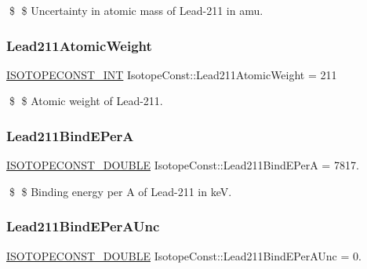 \$ \$ Uncertainty in atomic mass of Lead-\/211 in amu. \mbox{\label{group___isotope_const-_lead-_pb211_gae0bcf247364b4c5eb7ac9d0209ad4f38}} 
\subsubsection{\texorpdfstring{Lead211\+Atomic\+Weight}{Lead211AtomicWeight}}
{\footnotesize\ttfamily \mbox{\hyperlink{group___isotope_const-_macros_ga5f18360b3e99483a35c32d789e62621c}{I\+S\+O\+T\+O\+P\+E\+C\+O\+N\+S\+T\+\_\+\+I\+NT}} Isotope\+Const\+::\+Lead211\+Atomic\+Weight = 211}

\$ \$ Atomic weight of Lead-\/211. \mbox{\label{group___isotope_const-_lead-_pb211_ga064090f337e1e67f24c48af5af76c6e1}} 
\subsubsection{\texorpdfstring{Lead211\+Bind\+E\+PerA}{Lead211BindEPerA}}
{\footnotesize\ttfamily \mbox{\hyperlink{group___isotope_const-_macros_ga8f45a7272ce02c0b4c65c44636ed719a}{I\+S\+O\+T\+O\+P\+E\+C\+O\+N\+S\+T\+\_\+\+D\+O\+U\+B\+LE}} Isotope\+Const\+::\+Lead211\+Bind\+E\+PerA = 7817.}

\$ \$ Binding energy per A of Lead-\/211 in keV. \mbox{\label{group___isotope_const-_lead-_pb211_gaeeccc621add578a625ed7d5f1f6b406e}} 
\subsubsection{\texorpdfstring{Lead211\+Bind\+E\+Per\+A\+Unc}{Lead211BindEPerAUnc}}
{\footnotesize\ttfamily \mbox{\hyperlink{group___isotope_const-_macros_ga8f45a7272ce02c0b4c65c44636ed719a}{I\+S\+O\+T\+O\+P\+E\+C\+O\+N\+S\+T\+\_\+\+D\+O\+U\+B\+LE}} Isotope\+Const\+::\+Lead211\+Bind\+E\+Per\+A\+Unc = 0.}


